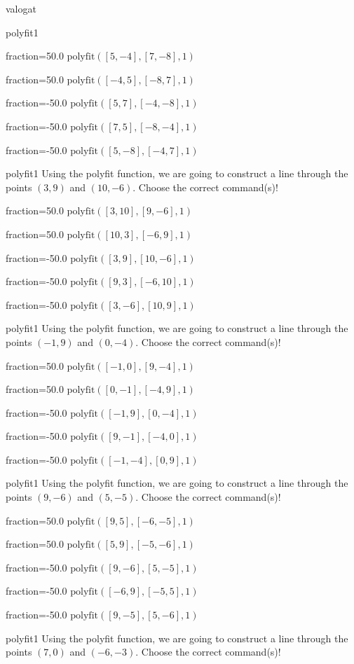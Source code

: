 \documentclass[12pt]{article}
\begin{document}
\begin{quiz}{valogat}
\begin{multi}[multiple]{polyfit1}
\item[fraction=50.0] $\mathrm{polyfit}([5,-4], [7,-8], 1)$
\item[fraction=50.0] $\mathrm{polyfit}([-4,5], [-8,7], 1)$
\item[fraction=-50.0]  $\mathrm{polyfit}([5,7], [-4,-8], 1)$
\item[fraction=-50.0]  $\mathrm{polyfit}([7,5], [-8,-4], 1)$
\item[fraction=-50.0]  $\mathrm{polyfit}([5,-8], [-4,7], 1)$
\end{multi}
\begin{multi}[multiple]{polyfit1}
Using the polyfit function, we are going to construct a line through the points $\left(3,9\right)$ and $\left(10,-6\right)$.
Choose the correct command(s)!

\item[fraction=50.0] $\mathrm{polyfit}([3,10], [9,-6], 1)$
\item[fraction=50.0] $\mathrm{polyfit}([10,3], [-6,9], 1)$
\item[fraction=-50.0]  $\mathrm{polyfit}([3,9], [10,-6], 1)$
\item[fraction=-50.0]  $\mathrm{polyfit}([9,3], [-6,10], 1)$
\item[fraction=-50.0]  $\mathrm{polyfit}([3,-6], [10,9], 1)$
\end{multi}
\begin{multi}[multiple]{polyfit1}
Using the polyfit function, we are going to construct a line through the points $\left(-1,9\right)$ and $\left(0,-4\right)$.
Choose the correct command(s)!

\item[fraction=50.0] $\mathrm{polyfit}([-1,0], [9,-4], 1)$
\item[fraction=50.0] $\mathrm{polyfit}([0,-1], [-4,9], 1)$
\item[fraction=-50.0]  $\mathrm{polyfit}([-1,9], [0,-4], 1)$
\item[fraction=-50.0]  $\mathrm{polyfit}([9,-1], [-4,0], 1)$
\item[fraction=-50.0]  $\mathrm{polyfit}([-1,-4], [0,9], 1)$
\end{multi}
\begin{multi}[multiple]{polyfit1}
Using the polyfit function, we are going to construct a line through the points $\left(9,-6\right)$ and $\left(5,-5\right)$.
Choose the correct command(s)!

\item[fraction=50.0] $\mathrm{polyfit}([9,5], [-6,-5], 1)$
\item[fraction=50.0] $\mathrm{polyfit}([5,9], [-5,-6], 1)$
\item[fraction=-50.0]  $\mathrm{polyfit}([9,-6], [5,-5], 1)$
\item[fraction=-50.0]  $\mathrm{polyfit}([-6,9], [-5,5], 1)$
\item[fraction=-50.0]  $\mathrm{polyfit}([9,-5], [5,-6], 1)$
\end{multi}
\begin{multi}[multiple]{polyfit1}
Using the polyfit function, we are going to construct a line through the points $\left(7,0\right)$ and $\left(-6,-3\right)$.
Choose the correct command(s)!


\end{multi}
\end{quiz}
\end{document}
